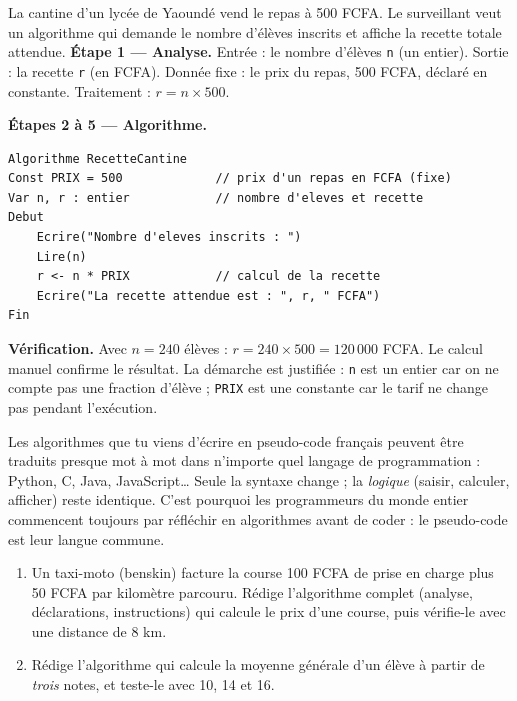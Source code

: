 \documentclass[11pt]{article}
\begin{document}
\begin{exoresolu}
La cantine d'un lycée de Yaoundé vend le repas à 500 FCFA. Le surveillant veut un algorithme qui demande le nombre d'élèves inscrits et affiche la recette totale attendue.
\tcblower
\textbf{Étape 1 — Analyse.} Entrée : le nombre d'élèves \texttt{n} (un entier). Sortie : la recette \texttt{r} (en FCFA). Donnée fixe : le prix du repas, 500 FCFA, déclaré en constante. Traitement : $r = n \times 500$.

\textbf{Étapes 2 à 5 — Algorithme.}
\begin{lstlisting}
Algorithme RecetteCantine
Const PRIX = 500             // prix d'un repas en FCFA (fixe)
Var n, r : entier            // nombre d'eleves et recette
Debut
    Ecrire("Nombre d'eleves inscrits : ")
    Lire(n)
    r <- n * PRIX            // calcul de la recette
    Ecrire("La recette attendue est : ", r, " FCFA")
Fin
\end{lstlisting}
\textbf{Vérification.} Avec $n = 240$ élèves : $r = 240 \times 500 = 120\,000$ FCFA. Le calcul manuel confirme le résultat. La démarche est justifiée : \texttt{n} est un entier car on ne compte pas une fraction d'élève ; \texttt{PRIX} est une constante car le tarif ne change pas pendant l'exécution.
\end{exoresolu}

\begin{savaistu}
Les algorithmes que tu viens d'écrire en pseudo-code français peuvent être traduits presque mot à mot dans n'importe quel langage de programmation : Python, C, Java, JavaScript\ldots{} Seule la syntaxe change ; la \emph{logique} (saisir, calculer, afficher) reste identique. C'est pourquoi les programmeurs du monde entier commencent toujours par réfléchir en algorithmes avant de coder : le pseudo-code est leur langue commune.
\end{savaistu}

\begin{exercice}
\begin{enumerate}
\item Un taxi-moto (benskin) facture la course 100 FCFA de prise en charge plus 50 FCFA par kilomètre parcouru. Rédige l'algorithme complet (analyse, déclarations, instructions) qui calcule le prix d'une course, puis vérifie-le avec une distance de 8 km.
\item Rédige l'algorithme qui calcule la moyenne générale d'un élève à partir de \emph{trois} notes, et teste-le avec 10, 14 et 16.
\end{enumerate}
\end{exercice}
\end{document}
